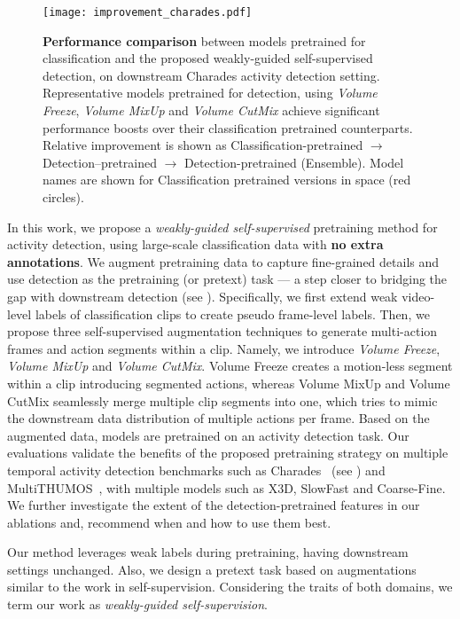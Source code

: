 \documentclass[letterpaper]{article} \usepackage{aaai23}  \usepackage{times}  \usepackage{helvet}  \usepackage{courier}  \usepackage[hyphens]{url}  \usepackage{graphicx} \urlstyle{rm} \def\UrlFont{\rm}  \usepackage{natbib}  \usepackage{caption} \frenchspacing  \setlength{\pdfpagewidth}{8.5in}  \setlength{\pdfpageheight}{11in}  \usepackage{algorithm}
\newcommand{\ch}{}
\begin{document}
\begin{figure}[t]
	\centering
	\texttt{[image: improvement\_charades.pdf]}
	\caption{\textbf{Performance comparison} between models pretrained for classification and the proposed weakly-guided self-supervised detection, on downstream Charades \cite{sigurdsson2016hollywood} activity detection setting.  Representative models pretrained for detection, using \textit{Volume Freeze}, \textit{Volume MixUp} and \textit{Volume CutMix} achieve significant performance boosts over their classification pretrained counterparts. Relative improvement is shown as Classification-pretrained $\rightarrow$ Detection--pretrained $\rightarrow$ Detection-pretrained (Ensemble). Model names are shown for Classification pretrained versions in space (red circles). }
	\label{fig:improvement}
\end{figure}


In this work, we propose a \textit{weakly-guided self-supervised} pretraining method for activity detection, using large-scale classification data with \textbf{no extra annotations}. We augment pretraining data to capture fine-grained details 
and use detection as the pretraining (or pretext) task --- a step closer to bridging the gap with downstream detection (see ). Specifically, we first extend weak video-level labels of classification clips to create pseudo frame-level labels. Then, we propose three self-supervised augmentation techniques to generate multi-action frames and action segments within a clip. Namely, we introduce \textit{Volume Freeze}, \textit{Volume MixUp} and \textit{Volume CutMix}. Volume Freeze creates a motion-less segment within a clip introducing segmented actions, whereas Volume MixUp and Volume CutMix seamlessly merge multiple clip segments into one, which tries to mimic the downstream data distribution of multiple actions per frame. Based on the augmented data, models are pretrained on an activity detection task. Our evaluations validate the benefits of the proposed pretraining strategy on multiple temporal activity detection benchmarks such as Charades~\cite{sigurdsson2016hollywood} (see ) and MultiTHUMOS~\cite{yeung2018every}, with multiple models such as X3D, SlowFast and Coarse-Fine. We further investigate the extent of the detection-pretrained features in our ablations and, recommend when and how to use them best.

\ch{Our method leverages weak labels 
during pretraining, having downstream settings unchanged. Also, we design a pretext task based on augmentations similar to the work in self-supervision.  Considering the traits of both domains, we term our work as \textit{weakly-guided self-supervision}.}
\end{document}
